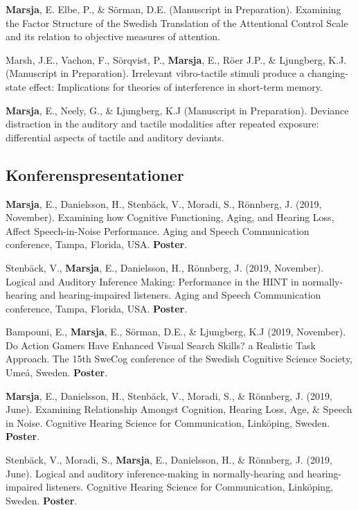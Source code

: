 \documentclass[]{article}
\begin{document}
\textbf{Marsja}, E. Elbe, P., \& Sörman, D.E. (Manuscript in
Preparation). Examining the Factor Structure of the Swedish Translation
of the Attentional Control Scale and its relation to objective measures
of attention.

Marsh, J.E., Vachon, F., Sörqvist, P., \textbf{Marsja}, E., Röer J.P.,
\& Ljungberg, K.J. (Manuscript in Preparation). Irrelevant vibro-tactile
stimuli produce a changing-state effect: Implications for theories of
interference in short-term memory.

\textbf{Marsja}, E., Neely, G., \& Ljungberg, K.J (Manuscript in
Preparation). Deviance distraction in the auditory and tactile
modalities after repeated exposure: differential aspects of tactile and
auditory deviants.

\hypertarget{konferenspresentationer}{%
\subsection{Konferenspresentationer}\label{konferenspresentationer}}

\textbf{Marsja}, E., Danielsson, H., Stenbäck, V., Moradi, S., Rönnberg,
J. (2019, November). Examining how Cognitive Functioning, Aging, and
Hearing Loss, Affect Speech-in-Noise Performance. Aging and Speech
Communication conference, Tampa, Florida, USA. \textbf{Poster}.

Stenbäck, V., \textbf{Marsja}, E., Danielsson, H., Rönnberg, J. (2019,
November). Logical and Auditory Inference Making: Performance in the
HINT in normally-hearing and hearing-impaired listeners. Aging and
Speech Communication conference, Tampa, Florida, USA. \textbf{Poster}.

Bampouni, E., \textbf{Marsja}, E., Sörman, D.E., \& Ljungberg, K.J
(2019, November). Do Action Gamers Have Enhanced Visual Search Skills? a
Realistic Task Approach. The 15th SweCog conference of the Swedish
Cognitive Science Society, Umeå, Sweden. \textbf{Poster}.

\textbf{Marsja}, E., Danielsson, H., Stenbäck, V., Moradi, S., \&
Rönnberg, J. (2019, June). Examining Relationship Amongst Cognition,
Hearing Loss, Age, \& Speech in Noise. Cognitive Hearing Science for
Communication, Linköping, Sweden. \textbf{Poster}.

Stenbäck, V., Moradi, S., \textbf{Marsja}, E., Danielsson, H., \&
Rönnberg, J. (2019, June). Logical and auditory inference-making in
normally-hearing and hearing-impaired listeners. Cognitive Hearing
Science for Communication, Linköping, Sweden. \textbf{Poster}.
\end{document}
